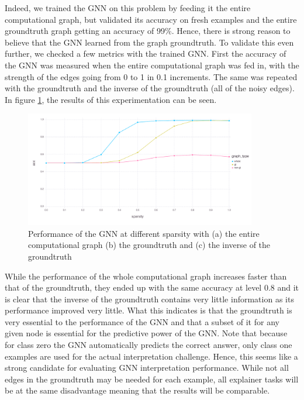 Indeed, we trained the GNN on this problem by feeding it the entire computational graph, but validated its accuracy on fresh examples and the entire groundtruth graph getting an accuracy of 99\%. Hence, there is strong reason to believe that the GNN learned from the graph groundtruth. To validate this even further, we checked a few metrics with the trained GNN. First the accuracy of the GNN was measured when the entire computational graph was fed in, with the strength of the edges going from 0 to 1 in 0.1 increments. The same was repeated with the groundtruth and the inverse of the groundtruth (all of the noisy edges). In figure \ref{fig:tree-model-sparsity}, the results of this experimentation can be seen. 
\begin{figure}[h]
	\centering
	\includegraphics[width=0.9\textwidth]{images/tree-model-sparsity.pdf}
	\caption{Performance of the GNN at different sparsity with (a) the entire computational graph (b) the groundtruth and (c) the inverse of the groundtruth}
	\label{fig:tree-model-sparsity}
\end{figure}

While the performance of the whole computational graph increases faster than that of the groundtruth, they ended up with the same accuracy at level 0.8 and it is clear that the inverse of the groundtruth contains very little information as its performance improved very little. What this indicates is that the groundtruth is very essential to the performance of the GNN and that a subset of it for any given node is essential for the predictive power of the GNN. Note that because for class zero the GNN automatically predicts the correct answer, only class one examples are used for the actual interpretation challenge. Hence, this seems like a strong candidate for evaluating GNN interpretation performance. While not all edges in the groundtruth may be needed for each example, all explainer tasks will be at the same disadvantage meaning that the results will be comparable.

\newpage

